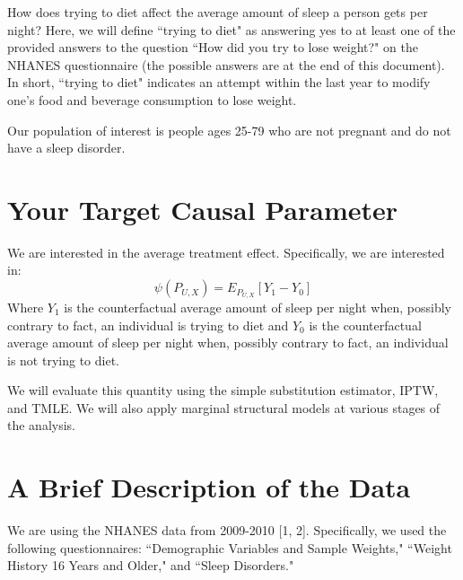 \documentclass{article}
\begin{document}
How does trying to diet affect the average amount of sleep a person gets per night?  Here, we will define ``trying to diet" as answering yes to at least one of the provided answers to the question  ``How did you try to lose weight?" on the NHANES questionnaire (the possible answers are at the end of this document).  In short, ``trying to diet" indicates an attempt within the last year to modify one's food and beverage consumption to lose weight.

Our population of interest is people ages 25-79 who are not pregnant and do not have a sleep disorder. 

\section{Your Target Causal Parameter}

We are interested in the average treatment effect. Specifically, we are interested in:
$$\psi(P_{U,X}) = E_{P_{U,X}}[Y_1-Y_0]$$
Where $Y_1$ is the counterfactual average amount of sleep per night when, possibly contrary to fact, an individual is trying to diet and $Y_0$ is the counterfactual average amount of sleep per night when, possibly contrary to fact, an individual is not trying to diet.

We will evaluate this quantity using the simple substitution estimator, IPTW, and TMLE. We will also apply marginal structural models at various stages of the analysis.

\section{A Brief Description of the Data}

We are using the NHANES data from 2009-2010 [1, 2].  Specifically, we used the following questionnaires: ``Demographic Variables and Sample Weights," ``Weight History 16 Years and Older," and ``Sleep Disorders."
\end{document}
